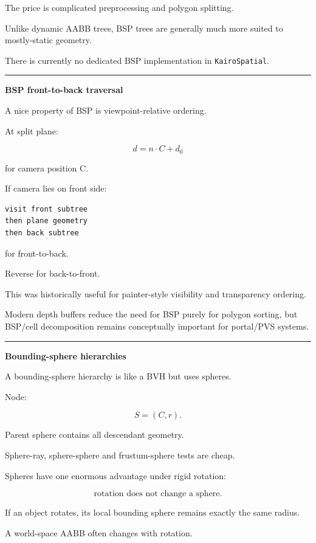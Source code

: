 The price is complicated preprocessing and polygon splitting.

Unlike dynamic AABB trees, BSP trees are generally much more suited to mostly-static geometry.

There is currently no dedicated BSP implementation in \texttt{KairoSpatial}.

\begin{center}\rule{0.5\linewidth}{0.5pt}\end{center}

\textbf{BSP front-to-back traversal}

A nice property of BSP is viewpoint-relative ordering.

At split plane:

\[
d=n\cdot C+d_0
\]

for camera position C.

If camera lies on front side:

\begin{verbatim}
visit front subtree
then plane geometry
then back subtree
\end{verbatim}

for front-to-back.

Reverse for back-to-front.

This was historically useful for painter-style visibility and transparency ordering.

Modern depth buffers reduce the need for BSP purely for polygon sorting, but BSP/cell decomposition remains conceptually important for portal/PVS systems.

\begin{center}\rule{0.5\linewidth}{0.5pt}\end{center}

\textbf{Bounding-sphere hierarchies}

A bounding-sphere hierarchy is like a BVH but uses spheres.

Node:

\[
S=(C,r).
\]

Parent sphere contains all descendant geometry.

Sphere-ray, sphere-sphere and frustum-sphere tests are cheap.

Spheres have one enormous advantage under rigid rotation:

\[
\text{rotation does not change a sphere}.
\]

If an object rotates, its local bounding sphere remains exactly the same radius.

A world-space AABB often changes with rotation.

